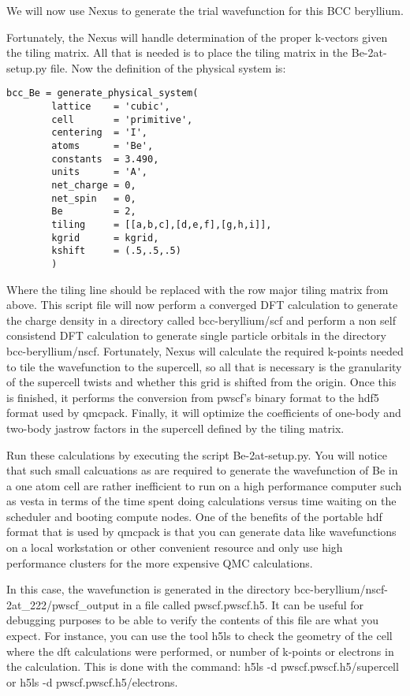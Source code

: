 We will now use Nexus to generate the trial wavefunction for this BCC beryllium.

Fortunately, the Nexus will handle determination of the proper k-vectors given the tiling matrix.  All that is needed is to place the tiling matrix in the Be-2at-setup.py file.   Now the definition of the physical system is:

\begin{lstlisting}[style=Python]
    bcc_Be = generate_physical_system(
        lattice    = 'cubic',
        cell       = 'primitive',
        centering  = 'I',
        atoms      = 'Be',
        constants  = 3.490,
        units      = 'A',
        net_charge = 0,
        net_spin   = 0,
        Be         = 2,
        tiling     = [[a,b,c],[d,e,f],[g,h,i]],
        kgrid      = kgrid,
        kshift     = (.5,.5,.5)
        )
\end{lstlisting}
Where the tiling line should be replaced with the row major tiling matrix from above.  This script file will now perform a converged DFT calculation to generate the charge density in a directory called bcc-beryllium/scf and perform a non self consistend DFT calculation to generate single particle orbitals in the directory bcc-beryllium/nscf.  Fortunately, Nexus will calculate the required k-points needed to tile the wavefunction to the supercell, so all that is necessary is the granularity of the supercell twists and whether this grid is shifted from the origin.  Once this is finished, it performs the conversion from pwscf's binary format to the hdf5 format used by qmcpack.  Finally, it will optimize the coefficients of one-body and two-body jastrow factors in the supercell defined by the tiling matrix.

Run these calculations by executing the script Be-2at-setup.py.  You will notice that such small calcuations as are required to generate the wavefunction of Be in a one atom cell are rather inefficient to run on a high performance computer such as vesta in terms of the time spent doing calculations versus time waiting on the scheduler and booting compute nodes.  One of the benefits of the portable hdf format that is used by qmcpack is that you can generate data like wavefunctions on a local workstation or other convenient resource and only use high performance clusters for the more expensive QMC calculations.

In this case, the wavefunction is generated in the directory bcc-beryllium/nscf-2at\_222/pwscf\_output in a file called pwscf.pwscf.h5.  It can be useful for debugging purposes to be able to verify the contents of this file are what you expect.  For instance, you can use the tool h5ls to check the geometry of the cell where the dft calculations were performed, or number of k-points or electrons in the calculation.  This is done with the command: h5ls -d pwscf.pwscf.h5/supercell or h5ls -d pwscf.pwscf.h5/electrons.

